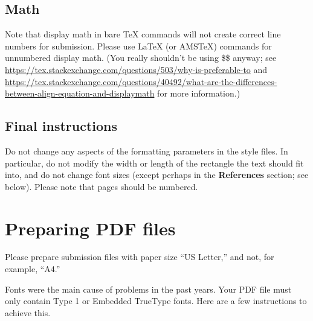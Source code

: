 \documentclass{article}
\begin{document}
\subsection{Math}
Note that display math in bare TeX commands will not create correct line numbers for submission. Please use LaTeX (or AMSTeX) commands for unnumbered display math. (You really shouldn't be using \$\$ anyway; see \url{https://tex.stackexchange.com/questions/503/why-is-preferable-to} and \url{https://tex.stackexchange.com/questions/40492/what-are-the-differences-between-align-equation-and-displaymath} for more information.)

\subsection{Final instructions}

Do not change any aspects of the formatting parameters in the style files.  In
particular, do not modify the width or length of the rectangle the text should
fit into, and do not change font sizes (except perhaps in the
\textbf{References} section; see below). Please note that pages should be
numbered.


\section{Preparing PDF files}


Please prepare submission files with paper size ``US Letter,'' and not, for
example, ``A4.''


Fonts were the main cause of problems in the past years. Your PDF file must only
contain Type 1 or Embedded TrueType fonts. Here are a few instructions to
achieve this.
\end{document}
